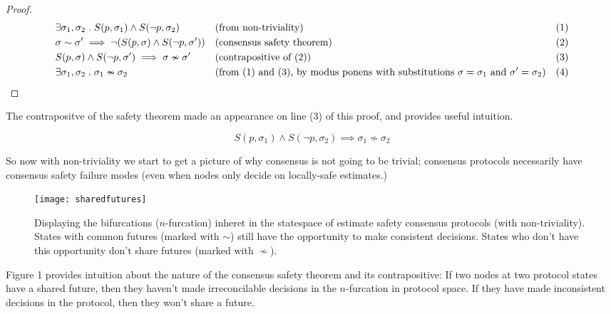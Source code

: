 \documentclass{article}
\theoremstyle{definition}
\begin{document}
\begin{proof}
\begin{align*}
  &\exists \sigma_1, \sigma_2 \hspace{1mm} . \hspace{1mm}S(p,\sigma_1) \land S(\neg{p},\sigma_2) &&\text{(from non-triviality)} &&\text{(1)}\\
  &\sigma \sim \sigma' \implies \neg(S(p,\sigma) \land S(\neg{p},\sigma')) &&\text{(consensus safety theorem)} &&\text{(2)}\\
  &S(p,\sigma) \land S(\neg{p},\sigma') \implies \sigma \nsim \sigma' &&\text{(contrapositive of (2))} &&\text{(3)}\\
  &\exists \sigma_1, \sigma_2 \hspace{1mm} . \hspace{1mm}\sigma_1 \nsim \sigma_2 \hspace{5mm} \qedhere &&\text{(from (1) and (3), by modus ponens with substitutions $\sigma=\sigma_1$ and $\sigma'=\sigma_2$)} &&\text{(4)}\\
\end{align*}
\end{proof}

The contrapositve of the safety theorem made an appearance on line (3) of this proof, and provides useful intuition.

\begin{lemma}
$$
S(p,\sigma_1) \land S(\neg{p},\sigma_2) \implies \sigma_1 \nsim \sigma_2
$$
\end{lemma}

So now with non-triviality we start to get a picture of why consensus is not going to be trivial; consensus protocols necessarily have consensus safety failure modes (even when nodes only decide on locally-safe estimates.)

\begin{figure}[!htb]
\centering
\texttt{[image: sharedfutures]}
\caption{Displaying the bifurcations ($n$-furcation) inheret in the statespace of estimate safety consensus protocols (with non-triviality). States with common futures (marked with $\sim$) still have the opportunity to make consistent decisions. States who don't have this opportunity don't share futures (marked with $\nsim$).}
\end{figure}

Figure 1 provides intuition about the nature of the consensus safety theorem and its contrapositive: If two nodes at two protocol states have a shared future, then they haven't made irreconcilable decisions in the $n$-furcation in protocol space. If they have made inconsistent decisions in the protocol, then they won't share a future.
\end{document}
